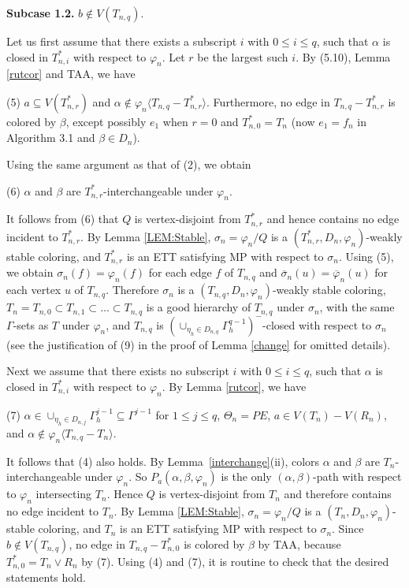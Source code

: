 \documentclass[11pt]{article}
\newcommand{\phibar}{\overline{\varphi}}
\begin{document}
{\bf Subcase 1.2.} $b \notin V(T_{n,q})$.  

Let us first assume that there exists a subscript $i$ with $0\le i \le q$, such that $\alpha$ is closed 
in $T^*_{n,i}$ with respect to $\varphi_n$. Let $r$ be the largest such $i$. By (5.10), Lemma \ref{rutcor} and TAA, we have

(5) $a \subseteq V(T_{n,r}^*)$ and $\alpha \notin \varphi_n \langle T_{n,q}- T_{n,r}^* \rangle$. Furthermore,
no edge in $T_{n,q}- T_{n,r}^*$ is colored by $\beta$, except possibly $e_1$ when $r=0$ and $T_{n,0}^*=T_n$ 
(now $e_1=f_n$ in Algorithm 3.1 and $\beta \in D_n$). 

Using the same argument as that of (2), we obtain 

(6) $\alpha$ and $\beta$ are $T_{n,r}^*$-interchangeable under $\varphi_n$. 

It follows from (6) that $Q$ is vertex-disjoint from $T_{n,r}^*$ and hence contains no edge incident to $T_{n,r}^*$. 
By Lemma \ref{LEM:Stable}, $\sigma_n=\varphi_n/Q$ is a $(T_{n,r}^*,D_n,\varphi_n)$-weakly stable coloring, and $T_{n,r}^*$ 
is an ETT satisfying MP with respect to $\sigma_n$. Using (5), we obtain $\sigma_n(f)=\varphi_n(f)$ for each edge $f$ 
of $T_{n,q}$ and $\overline{\sigma}_n(u)=\phibar_n(u)$ for each vertex $u$ of $T_{n,q}$.  Therefore $\sigma_n$ is a $(T_{n,q}, D_n,\varphi_n)$-weakly stable coloring, $T_n=T_{n,0} \subset T_{n,1} \subset \ldots \subset T_{n,q}$ is a good 
hierarchy of $T_{n,q}$  under $\sigma_n$, with the same $\Gamma$-sets as $T$ under $\varphi_n$, and $T_{n,q}$ is 
$(\cup_{\eta_h\in D_{n,q}}\Gamma^{q-1}_h)^-$-closed with respect to $\sigma_n$ (see the justification
of (9) in the proof of Lemma \ref{change} for omitted details). 

Next we assume that there exists no subscript $i$ with $0\le i \le q$, such that $\alpha$ is closed 
in $T^*_{n,i}$ with respect to $\varphi_n$. By Lemma \ref{rutcor}, we have

(7) $\alpha \in \cup_{\eta_h\in D_{n,j}}\Gamma^{j-1}_h \subseteq \Gamma^{j-1}$ for $1 \le j \le q$, 
$\Theta_n=PE$, $a \in V(T_n)-V(R_n)$, and $\alpha \notin \varphi_n \langle T_{n,q}- T_n \rangle$.  

It follows that (4) also holds. By Lemma~\ref{interchange}(ii), colors $\alpha$ and $\beta$ are $T_n$-interchangeable under $\varphi_n$. So $P_{a}(\alpha,\beta,\varphi_n)$ is the only $(\alpha,\beta)$-path with respect to $\varphi_n$ intersecting 
$T_n$. Hence $Q$ is vertex-disjoint from $T_n$ and therefore contains no edge incident to  $T_n$. By Lemma \ref{LEM:Stable}, $\sigma_n=\varphi_n/Q$ is a $(T_n, D_n,\varphi_n)$-stable coloring, and $T_n$ is an ETT satisfying MP with respect to 
$\sigma_n$.  Since $b \notin V(T_{n,q})$, no edge in $T_{n,q}- T_{n,0}^*$ is colored by $\beta$ by TAA, because
$T_{n,0}^*=T_n \vee R_n$ by (7). Using (4) and (7), it is routine to check that 
the desired statements hold.
\end{document}
